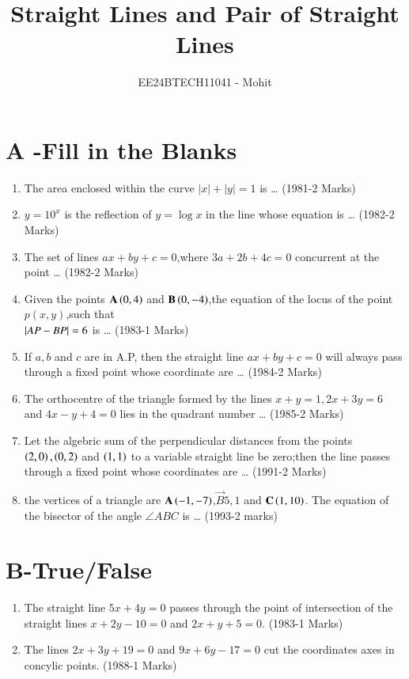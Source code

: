 \documentclass[journal,12pt,twocolumn]{IEEEtran}
\theoremstyle{remark}
\begin{document}

\vspace{3cm}

\title{Straight Lines and Pair of Straight Lines}
\author{EE24BTECH11041 - Mohit}
\maketitle
\newpage
\bigskip

\renewcommand{\thefigure}{\theenumi}
\renewcommand{\thetable}{\theenumi}

\section {A -Fill in the Blanks}
\begin{enumerate}
    \item The area enclosed within the curve $|x|+|y| =1$ is \dots
    \hfill(1981-2 Marks)
    \item $y = 10^x $ is the reflection of $y=\log x$ in the  line whose equation is \dots
    \hfill(1982-2 Marks)
    \item The set of lines $ax+by+c=0$,where $3a+2b+4c=0$ concurrent at the point \dots
    \hfill(1982-2 Marks)
    \item Given the points $\mathbf{A}\left(0,4\right)$ and $\mathbf{B}\left(0,-4\right)$,the equation of the locus of the point $p(x,y)$,such that \\
    $\left\vert AP-BP\right\vert=6$ is \dots
    \hfill(1983-1 Marks)
    \item If $a,b$ and $c$ are in A.P, then the straight line $ax +by +c=0$ will always pass through a fixed point whose coordinate are \dots
    \hfill(1984-2 Marks)
    \item The orthocentre of the triangle formed by the lines $x+y=1,2x +3y=6$ and $4x-y+4=0$ lies in the quadrant number \dots
    \hfill(1985-2 Marks)
    \item Let the algebric sum of the perpendicular distances from the points $\left(2,0\right),\left(0,2\right)$ and $\left(1,1\right)$ to a variable straight line be zero;then the line passes through a fixed point whose coordinates are \dots
    \hfill(1991-2 Marks)
    \item the vertices of a triangle are $\mathbf{A}\left(-1,-7\right)$,$\vec{B}{5,1}$ and $\mathbf{C}\left(1,10\right)$. The equation of the bisector of the angle $\angle{ABC}$ is \dots
    \hfill(1993-2 marks)
\end{enumerate}
\section {B-True/False}
\begin{enumerate}
    \item The straight line $5x+4y=0$ passes through the point of intersection of the straight lines $x+2y-10=0$ and $2x+y+5=0$.
    \hfill(1983-1 Marks)
    \item The lines $2x+3y+19=0$ and $9x+6y-17=0$ cut the coordinates axes in concylic points.
    \hfill(1988-1 Marks)
\end{enumerate}
\end{document}
